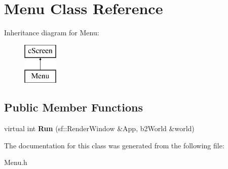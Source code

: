 \hypertarget{class_menu}{}\section{Menu Class Reference}
\label{class_menu}
Inheritance diagram for Menu\+:\begin{figure}[H]
\begin{center}
\leavevmode
\includegraphics[height=2.000000cm]{class_menu}
\end{center}
\end{figure}
\subsection*{Public Member Functions}
\begin{DoxyCompactItemize}
\item 
virtual int {\bfseries Run} (sf\+::\+Render\+Window \&App, b2\+World \&world)\hypertarget{class_menu_a897f7a7c0473f200f7e87afa610d96fc}{}\label{class_menu_a897f7a7c0473f200f7e87afa610d96fc}

\end{DoxyCompactItemize}


The documentation for this class was generated from the following file\+:\begin{DoxyCompactItemize}
\item 
Menu.\+h\end{DoxyCompactItemize}
